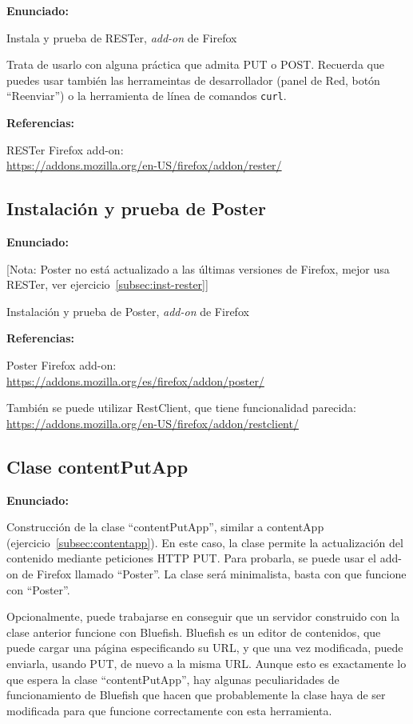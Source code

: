\textbf{Enunciado:}

Instala y prueba de RESTer, \emph{add-on} de Firefox

Trata de usarlo con alguna práctica que admita PUT o POST. Recuerda que puedes usar también las herrameintas de desarrollador (panel de Red, botón ``Reenviar'') o la herramienta de línea de comandos \verb|curl|.

\textbf{Referencias:}

RESTer Firefox add-on: \\
\url{https://addons.mozilla.org/en-US/firefox/addon/rester/}


\subsection{Instalación y prueba de Poster}
\label{subsec:inst-poster}

\textbf{Enunciado:}

[Nota: Poster no está actualizado a las últimas versiones de Firefox, mejor usa RESTer, ver ejercicio~\ref{subsec:inst-rester}]
  
Instalación y prueba de Poster, \emph{add-on} de Firefox

\textbf{Referencias:}

Poster Firefox add-on: \\
\url{https://addons.mozilla.org/es/firefox/addon/poster/}

También se puede utilizar RestClient, que tiene funcionalidad parecida: \\
\url{https://addons.mozilla.org/en-US/firefox/addon/restclient/}

\subsection{Clase contentPutApp}
\label{subsec:contentputapp}

\textbf{Enunciado:}

Construcción de la clase ``contentPutApp'', similar a contentApp (ejercicio~\ref{subsec:contentapp}). En este caso, la clase permite la actualización del contenido mediante peticiones HTTP PUT. Para probarla, se puede usar el add-on de Firefox llamado ``Poster''. La clase será minimalista, basta con que funcione con ``Poster''.

Opcionalmente, puede trabajarse en conseguir que un servidor construido con la clase anterior funcione con Bluefish. Bluefish es un editor de contenidos, que puede cargar una página especificando su URL, y que una vez modificada, puede enviarla, usando PUT, de nuevo a la misma URL. Aunque esto es exactamente lo que espera la clase ``contentPutApp'', hay algunas peculiaridades de funcionamiento de Bluefish que hacen que probablemente la clase haya de ser modificada para que funcione correctamente con esta herramienta.

